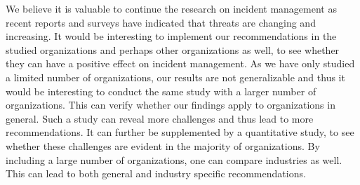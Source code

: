 We believe it is valuable to continue the research on incident management as recent reports and surveys have indicated that threats are changing and increasing. It would be interesting to implement our recommendations in the studied organizations and perhaps other organizations as well, to see whether they can have a positive effect on incident management. As we have only studied a limited number of organizations, our results are not generalizable and thus it would be interesting to conduct the same study with a larger number of organizations. This can verify whether our findings apply to organizations in general. Such a study can reveal more challenges and thus lead to more recommendations. It can further be supplemented by a quantitative study, to see whether these challenges are evident in the majority of organizations. By including a large number of organizations, one can compare industries as well. This can lead to both general and industry specific recommendations.
